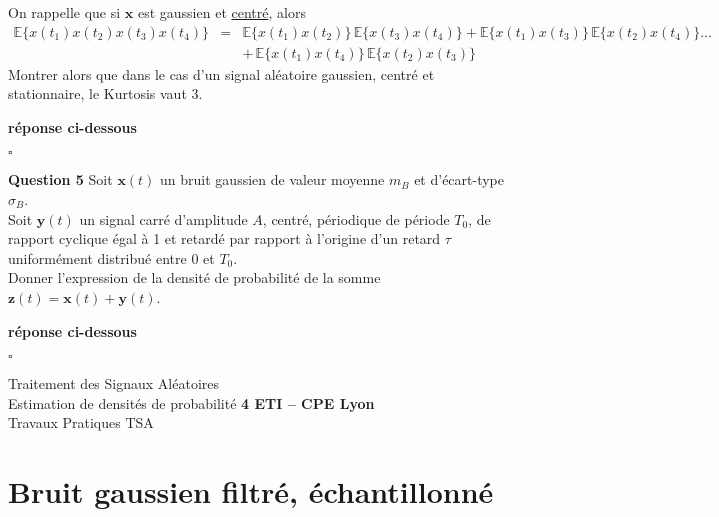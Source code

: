 \documentclass{article}
\newcommand{\debutrep}[1]{\color{blue}\begin{center} \hrulefill \textbf{ #1 } \hrulefill \end{center} }
\newcommand{\finrep}{\vspace*{5mm}\hfill $\square$\color{black}\vspace*{5mm}}
\begin{document}
\begin{list}{}{\setlength{\leftmargin}{2mm} \setlength{\labelwidth}{0mm} \setlength{\labelsep}{3mm} \setlength{\itemsep}{1mm} }
On rappelle que si $\mathbf{x}$ est gaussien et \underline{centré}, alors
\begin{eqnarray*}
\mathbb{E}\{x(t_1)x(t_2)x(t_3)x(t_4)\} & = & \mathbb{E}\{x(t_1)x(t_2)\} \, \mathbb{E}\{x(t_3)x(t_4)\} +  \mathbb{E}\{x(t_1)x(t_3)\}\,\mathbb{E}\{x(t_2)x(t_4)\}  \ldots \\
& &+ \,\mathbb{E}\{x(t_1)x(t_4)\}\,\mathbb{E}\{x(t_2)x(t_3)\} 
\end{eqnarray*}
Montrer alors que dans le cas d'un signal aléatoire gaussien, centré et stationnaire, le Kurtosis vaut 3.


\debutrep{réponse ci-dessous}
 
 \finrep
 

\item[\textbf{Question 5}] Soit $\mathbf{x}(t)$  un bruit gaussien de valeur moyenne $m_B$ et d'écart-type $\sigma_B$. \\
Soit $\mathbf{y}(t)$ un signal carré d'amplitude $A$, centré, périodique de période $T_0$, de rapport cyclique égal à 1 et retardé par rapport à l'origine d'un retard $\tau$ uniformément distribué entre $0$ et $T_0$.\\
Donner l'expression de la densité de probabilité de la somme $\mathbf{z}(t) = \mathbf{x}(t)+\mathbf{y}(t)$.


\debutrep{réponse ci-dessous}
 
\finrep
 
\end{list}

\clearpage

\begin{center}
{\Large Traitement des Signaux Aléatoires} \\
{\Large Estimation de densités de probabilité}
\textbf{4 ETI -- CPE Lyon }\\[3mm]
{Travaux Pratiques TSA}\\[3mm]
{}
\end{center}

\noindent{}
\vspace*{5mm}

\section{Bruit gaussien filtré, échantillonné}
\end{document}
